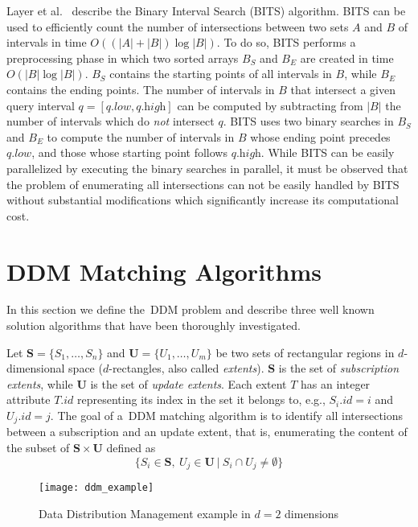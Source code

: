 \documentclass[10pt, conference, compsocconf]{IEEEtran}
\begin{document}
Layer et al.~\cite{Layer2012} describe the Binary Interval Search
(BITS) algorithm. BITS can be used to efficiently count the number of
intersections between two sets $A$ and $B$ of intervals in time
$O\left( (|A| + |B|) \log |B| \right)$. To do so, BITS performs a
preprocessing phase in which two sorted arrays $B_S$ and $B_E$ are
created in time $O(|B| \log |B|)$. $B_S$ contains the starting points
of all intervals in $B$, while $B_E$ contains the ending points. The
number of intervals in $B$ that intersect a given query interval $q =
[q.\textit{low}, q.\textit{high}]$ can be computed by subtracting from
$|B|$ the number of intervals which do \emph{not} intersect $q$. BITS
uses two binary searches in $B_S$ and $B_E$ to compute the number of
intervals in $B$ whose ending point precedes $q.\textit{low}$, and
those whose starting point follows $q.\textit{high}$. While BITS can
be easily parallelized by executing the binary searches in parallel,
it must be observed that the problem of enumerating all intersections
can not be easily handled by BITS without substantial modifications
which significantly increase its computational cost.


\section{DDM Matching Algorithms}\label{sec:ddm-algorithms}

In this section we define the~\ac{DDM} problem and describe three well
known solution algorithms that have been thoroughly investigated.

Let $\mathbf{S} = \{S_1, \ldots, S_n\}$ and $\mathbf{U}=\{U_1, \ldots,
U_m\}$ be two sets of rectangular regions in $d$-dimensional space
($d$-rectangles, also called \emph{extents}). $\mathbf{S}$ is the set
of \emph{subscription extents}, while $\mathbf{U}$ is the set of
\emph{update extents}. Each extent $T$ has an integer attribute
$T.\textit{id}$ representing its index in the set it belongs to, e.g.,
$S_i .\textit{id} = i$ and $U_j .\textit{id} = j$. The goal of
a~\ac{DDM} matching algorithm is to identify all intersections between
a subscription and an update extent, that is, enumerating the content
of the subset of $\mathbf{S} \times \mathbf{U}$ defined as
\[
\{S_i \in \mathbf{S},\ U_j \in \mathbf{U}\ |\ S_i \cap U_j \neq \emptyset\}
\]

\begin{figure}[t]
\centering\texttt{[image: ddm\_example]}
\caption{Data Distribution Management example in $d=2$ dimensions}\label{fig:ddm_example}
\end{figure}
\end{document}
